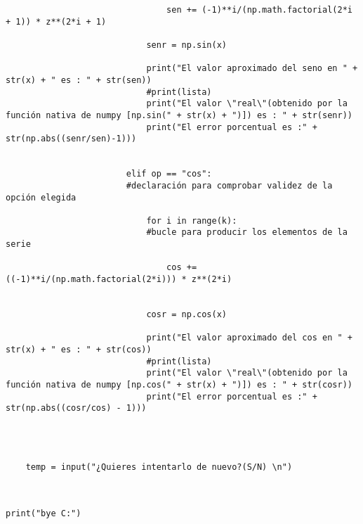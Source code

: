 \documentclass[12pt,a4paper]{article}
\begin{document}
\begin{verbatim}
                                sen += (-1)**i/(np.math.factorial(2*i + 1)) * z**(2*i + 1)
            
                            senr = np.sin(x)
            
                            print("El valor aproximado del seno en " + str(x) + " es : " + str(sen))
                            #print(lista)
                            print("El valor \"real\"(obtenido por la función nativa de numpy [np.sin(" + str(x) + ")]) es : " + str(senr))
                            print("El error porcentual es :" + str(np.abs((senr/sen)-1)))
                            
                
                        elif op == "cos":
                        #declaración para comprobar validez de la opción elegida
                    
                            for i in range(k):
                            #bucle para producir los elementos de la serie
                
                                cos += ((-1)**i/(np.math.factorial(2*i))) * z**(2*i)
                    
            
                            cosr = np.cos(x)
            
                            print("El valor aproximado del cos en " + str(x) + " es : " + str(cos))
                            #print(lista)
                            print("El valor \"real\"(obtenido por la función nativa de numpy [np.cos(" + str(x) + ")]) es : " + str(cosr))
                            print("El error porcentual es :" + str(np.abs((cosr/cos) - 1)))
            
                        
                    

    temp = input("¿Quieres intentarlo de nuevo?(S/N) \n")
    

   
print("bye C:")
\end{verbatim}
\end{document}
